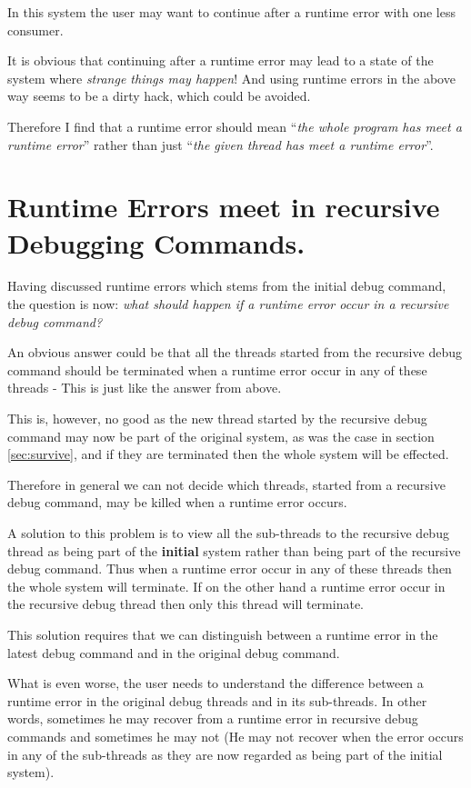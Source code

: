 \documentclass[]{article}
\begin{document}
In this system the user may want to continue after a runtime error with one
less consumer.

It is obvious that continuing after a runtime error may lead to a state of
the system where \emph{strange things may happen}! And using runtime errors
in the above way seems to be a dirty hack, which could be avoided. 

Therefore I find that a runtime error should mean ``\emph{the whole program has
meet a runtime error}'' rather than just ``\emph{the given thread has meet a
runtime error}''.


\section{Runtime Errors meet in recursive Debugging Commands.}
Having discussed runtime errors which stems from the initial debug command,
the question is now: \emph{what should happen if a runtime error
occur in a recursive debug command?}

An obvious answer could be that all the threads started from the recursive
debug command should be terminated when a runtime error occur in any of
these threads - This is just like the answer from above. 

This is, however, no good as the new thread started by the recursive debug
command may now be part of the original system, as was the case in section
\ref{sec:survive}, and if they are terminated then the whole system will be
effected.

Therefore in general we can not decide which threads, started from a
recursive debug command, may be killed when a runtime error occurs. 

A solution to this problem is to view all the sub-threads to the recursive
debug thread as being part of the \textbf{initial} system rather than being part of
the recursive debug command. Thus when a runtime error occur in any of
these threads then the whole system will terminate. If on the other hand a
runtime error occur in the recursive debug thread then only this thread will
terminate.

This solution requires that we can distinguish between a runtime error in
the latest debug command and in the original debug command.

What is even worse, the user needs to understand the difference between a
runtime error in the original debug threads and in its sub-threads. In
other words, sometimes he may recover from a runtime error in recursive
debug commands and sometimes he may not (He may not recover when the error
occurs in any of the sub-threads as they are now regarded as being part of
the initial system).
\end{document}
